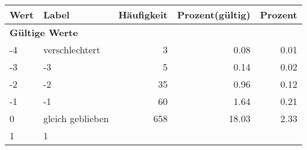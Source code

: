      \begin{longtable}{lXrrr}
     \toprule
     \textbf{Wert} & \textbf{Label} & \textbf{Häufigkeit} & \textbf{Prozent(gültig)} & \textbf{Prozent} \\
     \endhead
     \midrule
     \multicolumn{5}{l}{\textbf{Gültige Werte}}\\

     -4 &
     \multicolumn{1}{X}{ verschlechtert   } &


       \num{3} &
       \num[round-mode=places,round-precision=2]{0,08} &
         \num[round-mode=places,round-precision=2]{0,01} \\

     -3 &
     \multicolumn{1}{X}{ -3   } &


       \num{5} &
       \num[round-mode=places,round-precision=2]{0,14} &
         \num[round-mode=places,round-precision=2]{0,02} \\

     -2 &
     \multicolumn{1}{X}{ -2   } &


       \num{35} &
       \num[round-mode=places,round-precision=2]{0,96} &
         \num[round-mode=places,round-precision=2]{0,12} \\

     -1 &
     \multicolumn{1}{X}{ -1   } &


       \num{60} &
       \num[round-mode=places,round-precision=2]{1,64} &
         \num[round-mode=places,round-precision=2]{0,21} \\

     0 &
     \multicolumn{1}{X}{ gleich geblieben   } &


       \num{658} &
       \num[round-mode=places,round-precision=2]{18,03} &
         \num[round-mode=places,round-precision=2]{2,33} \\

     1 &
     \multicolumn{1}{X}{ 1   } &



\end{longtable}
